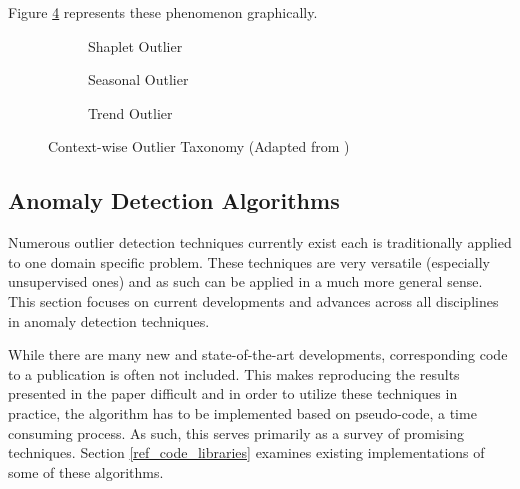 

Figure \ref{fig:contextual-outliers} represents these phenomenon graphically.

\begin{figure}[H]
     \centering
     \begin{subfigure}[b]{0.3\textwidth}
         \centering
         {\resizebox{\textwidth}{!}{}}
         \caption{Shaplet Outlier}
         \label{fig:shaplet}
     \end{subfigure}
     \hfill
     \begin{subfigure}[b]{0.3\textwidth}
         \centering
         {\resizebox{\textwidth}{!}{}}
         \caption{Seasonal Outlier}
         \label{fig:seasonal}
     \end{subfigure}
     \hfill
     \begin{subfigure}[b]{0.3\textwidth}
         \centering
         {\resizebox{\textwidth}{!}{}}
         \caption{Trend Outlier}
         \label{fig:trend}
     \end{subfigure}
        \caption{Context-wise Outlier Taxonomy (Adapted from \cite{lai2021revisiting})}
        \label{fig:contextual-outliers}
\end{figure}

\subsection{Anomaly Detection Algorithms}
\label{ref_anomaly_detection_alg}

Numerous outlier detection techniques currently exist each is traditionally applied to one domain specific problem. These techniques are very versatile (especially unsupervised ones) and as such can be applied in a much more general sense. This section focuses on current developments and advances across all disciplines in anomaly detection techniques.

While there are many new and state-of-the-art developments, corresponding code to a publication is often not included. This makes reproducing the results presented in the paper difficult and in order to utilize these techniques in practice, the algorithm has to be implemented based on pseudo-code, a time consuming process. As such, this serves primarily as a survey of promising techniques. Section \ref{ref_code_libraries} examines existing implementations of some of these algorithms.

